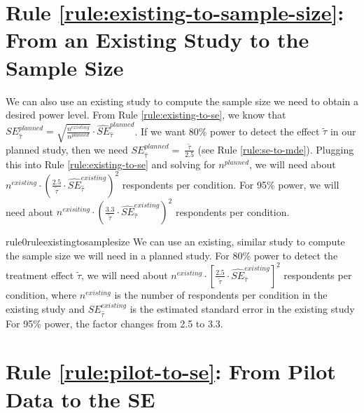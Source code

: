 \documentclass[12pt]{article}
\begin{document}
\section*{Rule \ref{rule:existing-to-sample-size}: From an Existing Study to the Sample Size}

We can also use an existing study to compute the sample size we need to obtain a desired power level.
From Rule \ref{rule:existing-to-se}, we know that $SE_{\widehat{\tau}}^{planned} = \sqrt{\frac{n^{existing}}{n^{planned}}} \cdot {\widehat{SE}}_{\widehat{\tau}}^{planned}$.
If we want 80\% power to detect the effect $\widetilde{\tau}$ in our planned study, then we need $SE_{\widehat{\tau}}^{planned} = \ \frac{\widetilde{\tau}}{2.5}$ (see
Rule \ref{rule:se-to-mde}). Plugging this into Rule \ref{rule:existing-to-se} and solving for $n^{planned}$, we will need about $n^{existing} \cdot \left( \frac{2.5}{\widetilde{\tau}} \cdot {\widehat{SE}}_{\widehat{\tau}}^{existing} \right)^{2}$ respondents per condition. 
For 95\% power, we will need about $n^{exisiting} \cdot \left( \frac{3.3}{\widetilde{\tau}} \cdot {\widehat{SE}}_{\widehat{\tau}}^{existing} \right)^{2}$ respondents per condition.

\begin{restatable}{rule0}{ruleexistingtosamplesize}
\label{rule:existing-to-sample-size}
We can use an existing, similar study to compute the sample size we will need in a planned study. For 80\% power to detect the treatment effect $\widetilde{\tau}$, we will need about $n^{existing} \cdot \left\lbrack \frac{2.5}{\widetilde{\tau}} \cdot {\widehat{SE}}_{\widehat{\tau}}^{existing} \right\rbrack^{2}$ respondents per condition, where $n^{existing}$ is the number of respondents per condition in the existing study and $SE_{\widehat{\tau}}^{existing}$ is the estimated standard error in the existing study
For 95\% power, the factor changes from 2.5 to 3.3.
\end{restatable}

\section*{Rule \ref{rule:pilot-to-se}: From Pilot Data to the SE}
\end{document}
